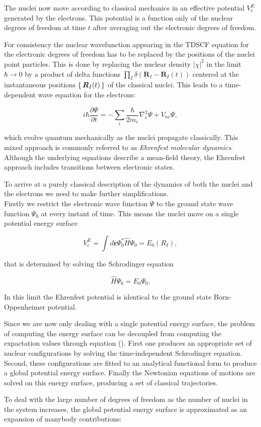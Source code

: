 The nuclei now move according to classical mechanics
in an effective potential $V_e^E$ generated by the electrons.
This potential is a function only of the nuclear
degrees of freedom at time $t$ after averaging out
the electronic degrees of freedom.
\par
For consistency the nuclear wavefunction appearing
in the TDSCF equation for the electronic
degrees of freedom has to be replaced by the positions
of the nuclei point particles.
This is done by replacing the nuclear density $\left| \chi \right|^2$
in the limit $\hbar \rightarrow 0$ by a product of delta functions
$ \prod_I \delta (\bm{R}_I - \bm{R}_I(t)) $ centered
at the instantaneous positions $\set{\bm{R}_I(t)}$
of the classical nuclei.
This leads to a time-dependent wave equation
for the electrons:

$$ i\hbar\frac{\partial \Psi}{\partial t} =
    -\sum_i \frac{\hbar}{2m_e} \nabla_i^2 \Psi
    + V_{ne} \Psi , $$

which evolve quantum mechanically as the nuclei propagate
classically.
This mixed approach is commonly referred to as
\textit{Ehrenfest molecular dynamics}.
Although the underlying equations describe a mean-field
theory, the Ehrenfest approach includes transitions
between electronic states.
\par
To arrive at a purely classical description of the
dynamics of both the nuclei and the electrons
we need to make further simplifications. \\
Firstly we restrict the electronic wave function $\Psi$
to the ground state wave function $\Psi_0$
at every instant of time.
This means the nuclei move on a single potential energy surface

$$ V_e^E = \int d\bm{r} \Psi_0^* \hat{H} \Psi_0 = E_0(R_I) , $$

that is determined by solving the Schrodinger equation

$$ \hat{H} \Psi_0 = E_0 \Psi_0 . $$

In this limit the Ehrenfest potential is identical
to the ground state Born-Oppenheimer potential.
\par
Since we are now only dealing with a single potential
energy surface, the problem of computing the energy surface
can be decoupled from computing the expactation values
through equation ().
First one produces an appropriate set of nuclear configurations
by solving the time-independent Schrodinger equation.
Second, these configurations are fitted to an analytical
functional form to produce a global potential energy surface.
Finally the Newtonian equations of motions are solved
on this energy surface, producing a set of classical
trajectories.
\par
To deal with the large number of degrees of freedom
as the number of nuclei in the system increases,
the global potential energy surface
is approximated as an expansion of manybody contributions:


